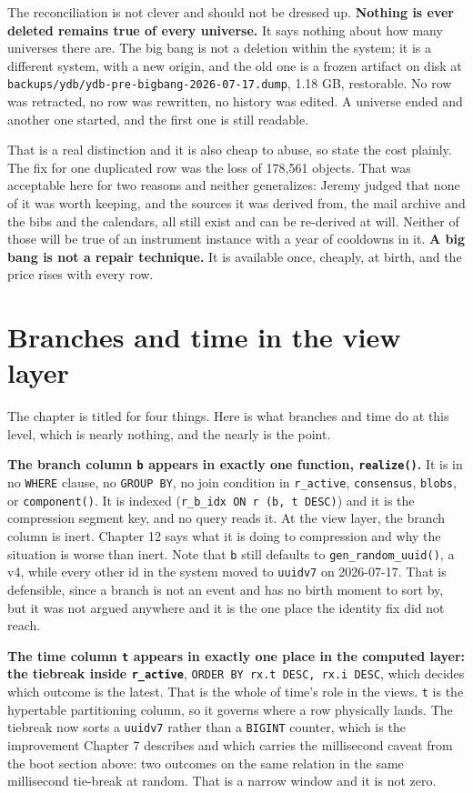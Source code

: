 The reconciliation is not clever and should not be dressed up. \textbf{Nothing is ever deleted remains true of every universe.} It says nothing about how many universes there are. The big bang is not a deletion within the system; it is a different system, with a new origin, and the old one is a frozen artifact on disk at \texttt{backups/ydb/ydb-pre-bigbang-2026-07-17.dump}, 1.18 GB, restorable. No row was retracted, no row was rewritten, no history was edited. A universe ended and another one started, and the first one is still readable.

That is a real distinction and it is also cheap to abuse, so state the cost plainly. The fix for one duplicated row was the loss of 178{,}561 objects. That was acceptable here for two reasons and neither generalizes: Jeremy judged that none of it was worth keeping, and the sources it was derived from, the mail archive and the bibs and the calendars, all still exist and can be re-derived at will. Neither of those will be true of an instrument instance with a year of cooldowns in it. \textbf{A big bang is not a repair technique.} It is available once, cheaply, at birth, and the price rises with every row.

\section{Branches and time in the view layer}

The chapter is titled for four things. Here is what branches and time do at this level, which is nearly nothing, and the nearly is the point.

\textbf{The branch column \texttt{b} appears in exactly one function, \texttt{realize()}.} It is in no \texttt{WHERE} clause, no \texttt{GROUP BY}, no join condition in \texttt{r\_active}, \texttt{consensus}, \texttt{blobs}, or \texttt{component()}. It is indexed (\texttt{r\_b\_idx ON r (b, t DESC)}) and it is the compression segment key, and no query reads it. At the view layer, the branch column is inert. Chapter 12 says what it is doing to compression and why the situation is worse than inert. Note that \texttt{b} still defaults to \texttt{gen\_random\_uuid()}, a v4, while every other id in the system moved to \texttt{uuidv7} on 2026-07-17. That is defensible, since a branch is not an event and has no birth moment to sort by, but it was not argued anywhere and it is the one place the identity fix did not reach.

\textbf{The time column \texttt{t} appears in exactly one place in the computed layer: the tiebreak inside \texttt{r\_active}}, \texttt{ORDER BY rx.t DESC, rx.i DESC}, which decides which outcome is the latest. That is the whole of time's role in the views. \texttt{t} is the hypertable partitioning column, so it governs where a row physically lands. The tiebreak now sorts a \texttt{uuidv7} rather than a \texttt{BIGINT} counter, which is the improvement Chapter 7 describes and which carries the millisecond caveat from the boot section above: two outcomes on the same relation in the same millisecond tie-break at random. That is a narrow window and it is not zero.

